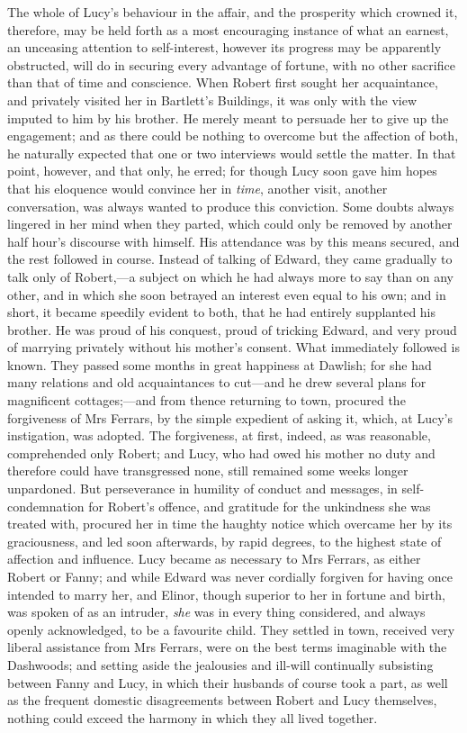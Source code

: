 The whole of Lucy’s behaviour in the affair, and the prosperity which crowned it, therefore, may be held forth as a most encouraging instance of what an earnest, an unceasing attention to self-interest, however its progress may be apparently obstructed, will do in securing every advantage of fortune, with no other sacrifice than that of time and conscience. When Robert first sought her acquaintance, and privately visited her in Bartlett’s Buildings, it was only with the view imputed to him by his brother. He merely meant to persuade her to give up the engagement; and as there could be nothing to overcome but the affection of both, he naturally expected that one or two interviews would settle the matter. In that point, however, and that only, he erred; for though Lucy soon gave him hopes that his eloquence would convince her in \textit{time}, another visit, another conversation, was always wanted to produce this conviction. Some doubts always lingered in her mind when they parted, which could only be removed by another half hour’s discourse with himself. His attendance was by this means secured, and the rest followed in course. Instead of talking of Edward, they came gradually to talk only of Robert,—a subject on which he had always more to say than on any other, and in which she soon betrayed an interest even equal to his own; and in short, it became speedily evident to both, that he had entirely supplanted his brother. He was proud of his conquest, proud of tricking Edward, and very proud of marrying privately without his mother’s consent. What immediately followed is known. They passed some months in great happiness at Dawlish; for she had many relations and old acquaintances to cut—and he drew several plans for magnificent cottages;—and from thence returning to town, procured the forgiveness of Mrs Ferrars, by the simple expedient of asking it, which, at Lucy’s instigation, was adopted. The forgiveness, at first, indeed, as was reasonable, comprehended only Robert; and Lucy, who had owed his mother no duty and therefore could have transgressed none, still remained some weeks longer unpardoned. But perseverance in humility of conduct and messages, in self-condemnation for Robert’s offence, and gratitude for the unkindness she was treated with, procured her in time the haughty notice which overcame her by its graciousness, and led soon afterwards, by rapid degrees, to the highest state of affection and influence. Lucy became as necessary to Mrs Ferrars, as either Robert or Fanny; and while Edward was never cordially forgiven for having once intended to marry her, and Elinor, though superior to her in fortune and birth, was spoken of as an intruder, \textit{she} was in every thing considered, and always openly acknowledged, to be a favourite child. They settled in town, received very liberal assistance from Mrs Ferrars, were on the best terms imaginable with the Dashwoods; and setting aside the jealousies and ill-will continually subsisting between Fanny and Lucy, in which their husbands of course took a part, as well as the frequent domestic disagreements between Robert and Lucy themselves, nothing could exceed the harmony in which they all lived together.

